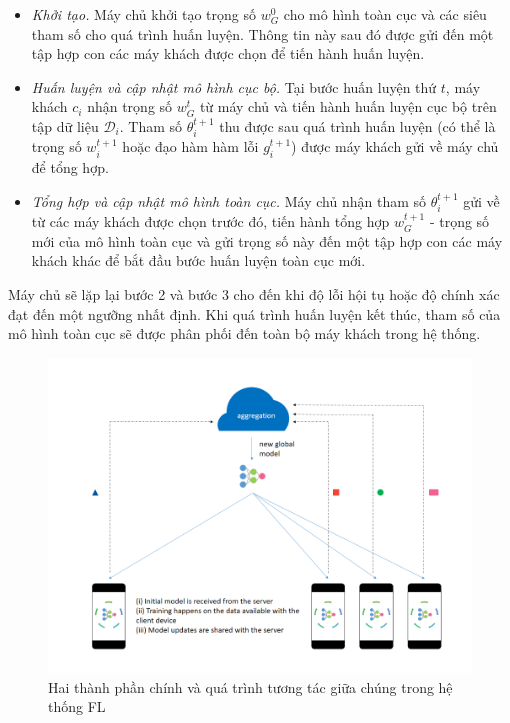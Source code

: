 \begin{itemize}
    \item \textit{Khởi tạo.} Máy chủ khởi tạo trọng số $w_G^0$ cho mô hình toàn cục và các siêu tham số cho quá trình huấn luyện. Thông tin này sau đó được gửi đến một tập hợp con các máy khách được chọn để tiến hành huấn luyện.

    \item \textit{Huấn luyện và cập nhật mô hình cục bộ.} Tại bước huấn luyện thứ $t$, máy khách $c_i$ nhận trọng số $w_G^t$ từ máy chủ và tiến hành huấn luyện cục bộ trên tập dữ liệu $\mathcal{D}_i$. Tham số $\theta_i^{t+1}$ thu được sau quá trình huấn luyện (có thể là trọng số $w_i^{t+1}$ hoặc đạo hàm hàm lỗi $g_i^{t+1}$) được máy khách gửi về máy chủ để tổng hợp.

    \item \textit{Tổng hợp và cập nhật mô hình toàn cục.} Máy chủ nhận tham số $\theta_i^{t+1}$ gửi về từ các máy khách được chọn trước đó, tiến hành tổng hợp $w_G^{t+1}$ - trọng số mới của mô hình toàn cục và gửi trọng số này đến một tập hợp con các máy khách khác để bắt đầu bước huấn luyện toàn cục mới.
\end{itemize}

Máy chủ sẽ lặp lại bước 2 và bước 3 cho đến khi độ lỗi hội tụ hoặc độ chính xác đạt đến một ngưỡng nhất định. Khi quá trình huấn luyện kết thúc, tham số của mô hình toàn cục sẽ được phân phối đến toàn bộ máy khách trong hệ thống.

\begin{figure}[H]
    \begin{center}
        \includegraphics[scale=0.85]{images/fl.png}
        \caption{Hai thành phần chính và quá trình tương tác giữa chúng trong hệ thống FL \cite{chandorikar_2020}}
        \label{fig:fl}
    \end{center}
\end{figure}

